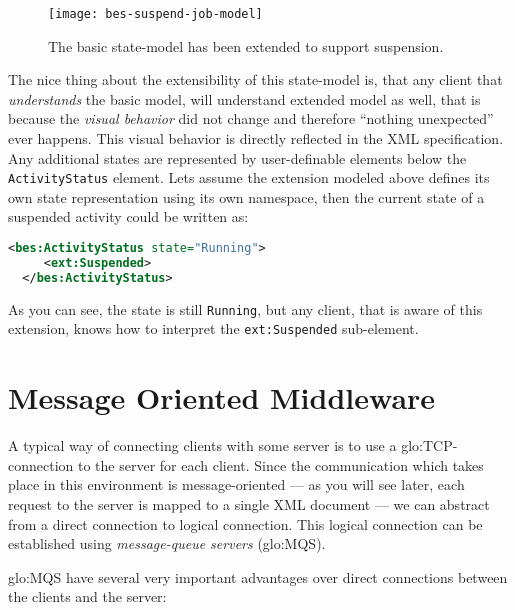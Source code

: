 \begin{figure}[h]
  \centering
  \texttt{[image: bes-suspend-job-model]}
  \caption[Extended  BES Job-State-Model]{The  basic state-model  has been
    extended to support suspension.}
  \label{fig:bes-suspend-model}
\end{figure}

The nice  thing about the extensibility  of this state-model  is, that any
client that  \emph{understands} the basic model,  will understand extended
model as well,  that is because the \emph{visual  behavior} did not change
and therefore ``nothing unexpected'' ever happens. This visual behavior is
directly reflected  in the XML  specification.  Any additional  states are
represented by  user-definable elements below  the \texttt{ActivityStatus}
element. Lets  assume the  extension modeled above  defines its  own state
representation  using its  own  namespace,  then the  current  state of  a
suspended activity could be written as:

\begin{lstlisting}[language=XML]
  <bes:ActivityStatus state="Running">
     <ext:Suspended>
  </bes:ActivityStatus>
\end{lstlisting}

As you can see, the state  is still \texttt{Running}, but any client, that
is   aware    of   this   extension,   knows   how    to   interpret   the
\texttt{ext:Suspended} sub-element.

\section{Message Oriented Middleware}
\label{sec:basic-communcation-architecture}

A  typical  way  of connecting  clients  with  some  server  is to  use  a
\gls{glo:TCP}-connection  to  the  server  for  each  client.   Since  the
communication which  takes place  in this environment  is message-oriented
--- as  you will  see later,  each request to  the server  is mapped  to a
single  XML document  ---  we can  abstract  from a  direct connection  to
logical  connection.  This  logical  connection can  be established  using
\emph{message-queue servers} (\gls{glo:MQS}).

\gls{glo:MQS}   have  several  very   important  advantages   over  direct
connections between the clients and the server:

